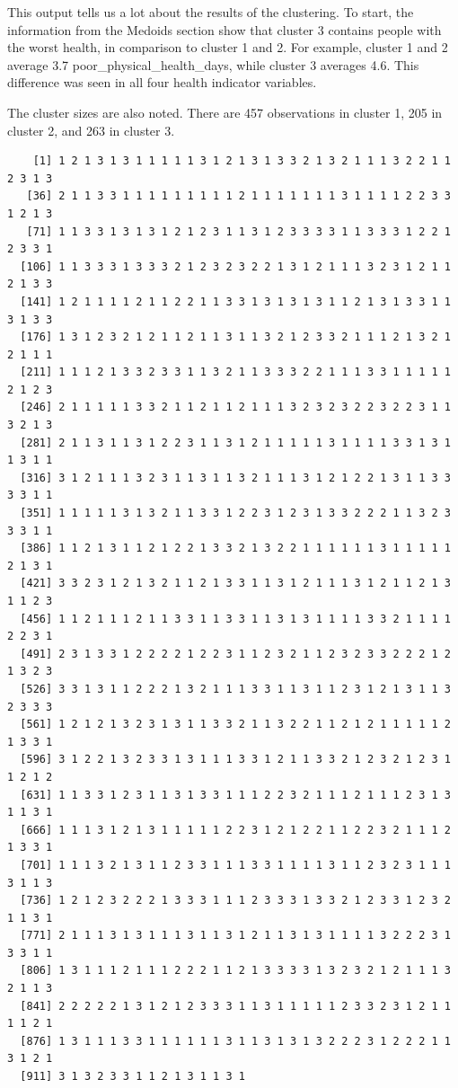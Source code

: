 \documentclass[12pt,twoside]{amherstthesis}
\begin{document}
  This output tells us a lot about the results of the clustering. To
  start, the information from the Medoids section show that cluster 3
  contains people with the worst health, in comparison to cluster 1 and 2.
  For example, cluster 1 and 2 average 3.7 poor\_physical\_health\_days,
  while cluster 3 averages 4.6. This difference was seen in all four
  health indicator variables.
  
  The cluster sizes are also noted. There are 457 observations in cluster
  1, 205 in cluster 2, and 263 in cluster 3.
  
  \begin{Shaded}
  \begin{Highlighting}[]
  
  \OperatorTok{$}
  \end{Highlighting}
  \end{Shaded}
  
  \begin{verbatim}
    [1] 1 2 1 3 1 3 1 1 1 1 1 3 1 2 1 3 1 3 3 2 1 3 2 1 1 1 3 2 2 1 1 2 3 1 3
   [36] 2 1 1 3 3 1 1 1 1 1 1 1 1 1 2 1 1 1 1 1 1 1 3 1 1 1 1 2 2 3 3 1 2 1 3
   [71] 1 1 3 3 1 3 1 3 1 2 1 2 3 1 1 3 1 2 3 3 3 3 1 1 3 3 3 1 2 2 1 2 3 3 1
  [106] 1 1 3 3 3 1 3 3 3 2 1 2 3 2 3 2 2 1 3 1 2 1 1 1 3 2 3 1 2 1 1 2 1 3 3
  [141] 1 2 1 1 1 1 2 1 1 2 2 1 1 3 3 1 3 1 3 1 3 1 1 2 1 3 1 3 3 1 1 3 1 3 3
  [176] 1 3 1 2 3 2 1 2 1 1 2 1 1 3 1 1 3 2 1 2 3 3 2 1 1 1 2 1 3 2 1 2 1 1 1
  [211] 1 1 1 2 1 3 3 2 3 3 1 1 3 2 1 1 3 3 3 2 2 1 1 1 3 3 1 1 1 1 1 2 1 2 3
  [246] 2 1 1 1 1 1 3 3 2 1 1 2 1 1 2 1 1 1 3 2 3 2 3 2 2 3 2 2 3 1 1 3 2 1 3
  [281] 2 1 1 3 1 1 3 1 2 2 3 1 1 3 1 2 1 1 1 1 1 3 1 1 1 1 3 3 1 3 1 1 3 1 1
  [316] 3 1 2 1 1 1 3 2 3 1 1 3 1 1 3 2 1 1 1 3 1 2 1 2 2 1 3 1 1 3 3 3 3 1 1
  [351] 1 1 1 1 1 3 1 3 2 1 1 3 3 1 2 2 3 1 2 3 1 3 3 2 2 2 1 1 3 2 3 3 3 1 1
  [386] 1 1 2 1 3 1 1 2 1 2 2 1 3 3 2 1 3 2 2 1 1 1 1 1 1 3 1 1 1 1 1 2 1 3 1
  [421] 3 3 2 3 1 2 1 3 2 1 1 2 1 3 3 1 1 3 1 2 1 1 1 3 1 2 1 1 2 1 3 1 1 2 3
  [456] 1 1 2 1 1 1 2 1 1 3 3 1 1 3 3 1 1 3 1 3 1 1 1 1 3 3 2 1 1 1 1 2 2 3 1
  [491] 2 3 1 3 3 1 2 2 2 2 1 2 2 3 1 1 2 3 2 1 1 2 3 2 3 3 2 2 2 1 2 1 3 2 3
  [526] 3 3 1 3 1 1 2 2 2 1 3 2 1 1 1 3 3 1 1 3 1 1 2 3 1 2 1 3 1 1 3 2 3 3 3
  [561] 1 2 1 2 1 3 2 3 1 3 1 1 3 3 2 1 1 3 2 2 1 1 2 1 2 1 1 1 1 1 2 1 3 3 1
  [596] 3 1 2 2 1 3 2 3 3 1 3 1 1 1 3 3 1 2 1 1 3 3 2 1 2 3 2 1 2 3 1 1 2 1 2
  [631] 1 1 3 3 1 2 3 1 1 3 1 3 3 1 1 1 2 2 3 2 1 1 1 2 1 1 1 2 3 1 3 1 1 3 1
  [666] 1 1 1 3 1 2 1 3 1 1 1 1 1 2 2 3 1 2 1 2 2 1 1 2 2 3 2 1 1 1 2 1 3 3 1
  [701] 1 1 1 3 2 1 3 1 1 2 3 3 1 1 1 3 3 1 1 1 1 3 1 1 2 3 2 3 1 1 1 3 1 1 3
  [736] 1 2 1 2 3 2 2 2 1 3 3 3 1 1 1 2 3 3 3 1 3 3 2 1 2 3 3 1 2 3 2 1 1 3 1
  [771] 2 1 1 1 3 1 3 1 1 1 3 1 1 3 1 2 1 1 3 1 3 1 1 1 1 3 2 2 2 3 1 3 3 1 1
  [806] 1 3 1 1 1 2 1 1 1 2 2 2 1 1 2 1 3 3 3 3 1 3 2 3 2 1 2 1 1 1 3 2 1 1 3
  [841] 2 2 2 2 2 1 3 1 2 1 2 3 3 3 1 1 3 1 1 1 1 1 2 3 3 2 3 1 2 1 1 1 1 2 1
  [876] 1 3 1 1 1 3 3 1 1 1 1 1 1 3 1 1 3 1 3 1 3 2 2 2 3 1 2 2 2 1 1 3 1 2 1
  [911] 3 1 3 2 3 3 1 1 2 1 3 1 1 3 1
  \end{verbatim}
  
\end{document}
